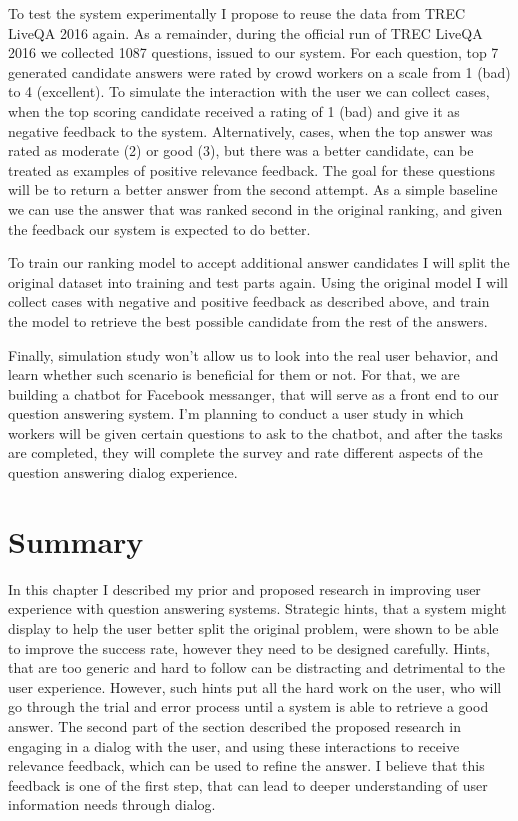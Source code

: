 To test the system experimentally I propose to reuse the data from TREC LiveQA 2016 again.
As a remainder, during the official run of TREC LiveQA 2016 we collected 1087 questions, issued to our system.
For each question, top 7 generated candidate answers were rated by crowd workers on a scale from 1 (bad) to 4 (excellent).
To simulate the interaction with the user we can collect cases, when the top scoring candidate received a rating of 1 (bad) and give it as negative feedback to the system.
Alternatively, cases, when the top answer was rated as moderate (2) or good (3), but there was a better candidate, can be treated as examples of positive relevance feedback.
The goal for these questions will be to return a better answer from the second attempt.
As a simple baseline we can use the answer that was ranked second in the original ranking, and given the feedback our system is expected to do better.

To train our ranking model to accept additional answer candidates I will split the original dataset into training and test parts again.
Using the original model I will collect cases with negative and positive feedback as described above, and train the model to retrieve the best possible candidate from the rest of the answers.

Finally, simulation study won't allow us to look into the real user behavior, and learn whether such scenario is beneficial for them or not.
For that, we are building a chatbot for Facebook messanger, that will serve as a front end to our question answering system.
I'm planning to conduct a user study in which workers will be given certain questions to ask to the chatbot, and after the tasks are completed, they will complete the survey and rate different aspects of the question answering dialog experience.

\section{Summary}
\label{section:users:summary}

In this chapter I described my prior and proposed research in improving user experience with question answering systems.
Strategic hints, that a system might display to help the user better split the original problem, were shown to be able to improve the success rate, however they need to be designed carefully.
Hints, that are too generic and hard to follow can be distracting and detrimental to the user experience.
However, such hints put all the hard work on the user, who will go through the trial and error process until a system is able to retrieve a good answer.
The second part of the section described the proposed research in engaging in a dialog with the user, and using these interactions to receive relevance feedback, which can be used to refine the answer.
I believe that this feedback is one of the first step, that can lead to deeper understanding of user information needs through dialog.
